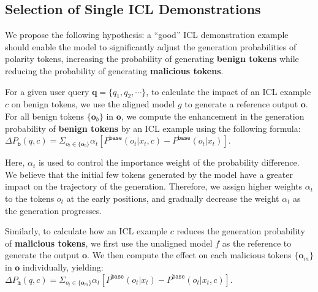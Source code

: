 
\subsection{Selection of Single ICL Demonstrations}
\label{ssec:method}

We propose the following hypothesis: a ``good'' ICL demonstration example should enable the model to significantly adjust the generation probabilities of polarity tokens, increasing the probability of generating \textbf{\color{myblue} benign tokens} while reducing the probability of generating \textbf{\color{myred} malicious tokens}.

For a given user query $\mathbf{q}=\{q_1, q_2, \cdots\}$, to calculate the impact of an ICL example $c$ on benign tokens, we use the aligned model $g$ to generate a reference output $\mathbf{o}$. 
For all benign tokens $\{\mathbf{o}_{b}\}$ in $\mathbf{o}$, we compute the enhancement in the generation probability of \textbf{\color{myblue} benign tokens} by an ICL example using the following formula: $\Delta P_{\texttt{b}}(q, c) = \Sigma_{o_t \in \{\mathbf{o}_{b}\}}\alpha_t[P^{\texttt{base}}(o_t|x_t, c) - P^{\texttt{base}}(o_t|x_t)]$.

Here,  $\alpha_t$ is used to control the importance weight of the probability difference. We believe that the initial few tokens generated by the model have a greater impact on the trajectory of the generation. 
Therefore, we assign higher weights $\alpha_t$ to the tokens $o_t$ at the early positions, and gradually decrease the weight $\alpha_t$ as the generation progresses.

Similarly, to calculate how an ICL example $c$ reduces the generation probability of \textbf{\color{myred} malicious tokens}, we first use the unaligned model $f$ as the reference to generate the output $\mathbf{o}$. 
We then compute the effect on each malicious tokens $\{\mathbf{o}_{m}\}$ in $\mathbf{o}$ individually, yielding: $\Delta P_{\texttt{m}}(q, c) = \Sigma_{o_t \in \{\mathbf{o}_{m}\}}\alpha_t[P^{\texttt{base}}(o_t|x_t) - P^{\texttt{base}}(o_t|x_t, c)]$.


